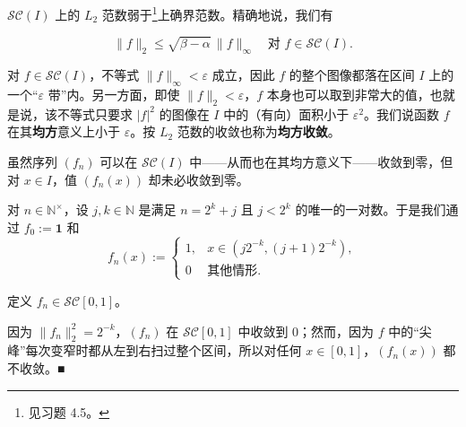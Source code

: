 \begin{remark}

\begin{items}
\item

$ \mathcal{SC}(I) $ 上的 $ L_{2} $ 范数弱于\footnote{见习题 4.5。}上确界范数。精确地说，我们有

\[
\|f\|_{2} \le \sqrt{\beta - \alpha}\,\|f\|_{\infty} \quad \text{对 } f \in \mathcal{SC}(I) .
\]
\item

对 $ f \in \mathcal{SC}(I) $，不等式 $ \|f\|_{\infty} < \varepsilon $ 成立，因此 $ f $ 的整个图像都落在区间 $ I $ 上的一个“$ \varepsilon $ 带”内。另一方面，即使 $ \|f\|_{2} < \varepsilon $，$ f $ 本身也可以取到非常大的值，也就是说，该不等式只要求 $ |f|^{2} $ 的图像在 $ I $ 中的（有向）面积小于 $ \varepsilon^{2} $。我们说函数 $ f $ 在其\textbf{均方}意义上小于 $ \varepsilon $。按 $ L_{2} $ 范数的收敛也称为\textbf{均方收敛}。

\end{items}


\begin{items}
\item[（c）]

虽然序列 $ (f_{n}) $ 可以在 $ \mathcal{SC}(I) $ 中——从而也在其均方意义下——收敛到零，但对 $ x \in I $，值 $ (f_{n}(x)) $ 却未必收敛到零。

\proofhead
对 $ n \in \mathbb{N}^{\times} $，设 $ j, k \in \mathbb{N} $ 是满足 $ n = 2^{k} + j $ 且 $ j < 2^{k} $ 的唯一的一对数。于是我们通过 $ f_{0} := \mathbf{1} $ 和
\begin{equation*}
f_{n}(x) := \begin{cases} 1 , & x \in (j2^{-k}, (j+1)2^{-k}) , \\ 0 & \text{其他情形} . \end{cases}
\end{equation*}

定义 $ f_{n} \in \mathcal{SC}[0, 1] $。

\end{items}


因为 $ \|f_{n}\|_{2}^{2} = 2^{-k} $，$ (f_{n}) $ 在 $ \mathcal{SC}[0, 1] $ 中收敛到 $ 0 $；然而，因为 $ f $ 中的“尖峰”每次变窄时都从左到右扫过整个区间，所以对任何 $ x \in [0, 1] $，$ (f_{n}(x)) $ 都不收敛。\nobreak\hspace{0.35em}■

\end{remark}

